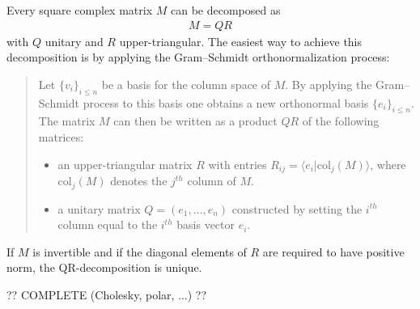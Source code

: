     \begin{method}[QR Decomposition]
        Every square complex matrix $M$ can be decomposed as
        \begin{gather}
            M = QR
        \end{gather}
        with $Q$ unitary and $R$ upper-triangular. The easiest way to achieve this decomposition is by applying the Gram--Schmidt orthonormalization process:
        \begin{quote}
            Let $\{v_i\}_{i\leq n}$ be a basis for the column space of $M$. By applying the Gram--Schmidt process to this basis one obtains a new orthonormal basis $\{e_i\}_{i\leq n}$. The matrix $M$ can then be written as a product $QR$ of the following matrices:
            \begin{itemize}
                \item an upper-triangular matrix $R$ with entries $R_{ij} = \langle e_i|\mathrm{col}_j(M) \rangle$, where $\mathrm{col}_j(M)$ denotes the $j^{th}$ column of $M$.
                \item a unitary matrix $Q=(e_1,\ldots,e_n)$ constructed by setting the $i^{th}$ column equal to the $i^{th}$ basis vector $e_i$.
            \end{itemize}
        \end{quote}
    \end{method}
    \begin{property}
        If $M$ is invertible and if the diagonal elements of $R$ are required to have positive norm, the QR-decomposition is unique.
    \end{property}

    ?? COMPLETE (Cholesky, polar, ...) ??
